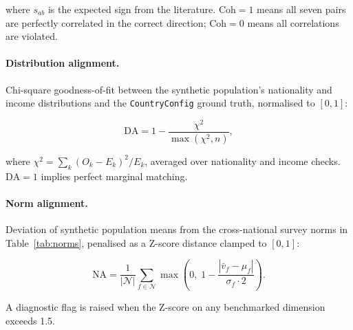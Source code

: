 \documentclass[a4paper,12pt]{article}
\begin{document}
where $s_{ab}$ is the expected sign from the literature. $\text{Coh} = 1$
means all seven pairs are perfectly correlated in the correct direction;
$\text{Coh} = 0$ means all correlations are violated.

\paragraph{Distribution alignment.}
Chi-square goodness-of-fit between the synthetic population's nationality
and income distributions and the \texttt{CountryConfig} ground truth,
normalised to $[0,1]$:

\begin{equation}
  \text{DA} = 1 - \frac{\chi^2}{\max(\chi^2, n)},
  \label{eq:distribution_alignment}
\end{equation}

where $\chi^2 = \sum_k (O_k - E_k)^2 / E_k$, averaged over nationality
and income checks. $\text{DA} = 1$ implies perfect marginal matching.

\paragraph{Norm alignment.}
Deviation of synthetic population means from the cross-national survey
norms in Table~\ref{tab:norms}, penalised as a Z-score distance
clamped to $[0,1]$:

\begin{equation}
  \text{NA} = \frac{1}{|\mathcal{N}|}\sum_{f \in \mathcal{N}}
              \max\!\left(0,\; 1 - \frac{|\bar{v}_f - \mu_f|}{\sigma_f \cdot 2}\right).
  \label{eq:norm_align}
\end{equation}

A diagnostic flag is raised when the Z-score on any benchmarked dimension
exceeds 1.5.
\end{document}
